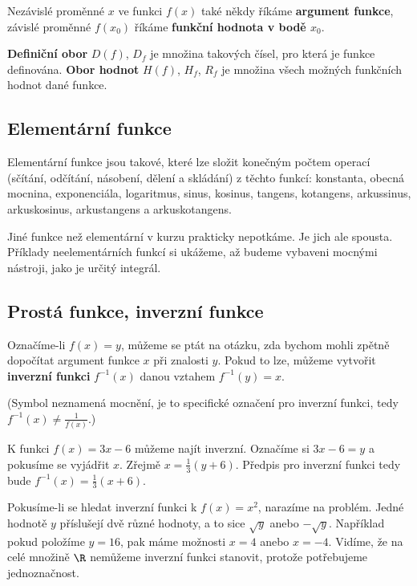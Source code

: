 Nezávislé proměnné $x$ ve funkci $f(x)$ také někdy říkáme \textbf{argument funkce}, závislé proměnné $f(x_0)$ říkáme \textbf{funkční hodnota v bodě $x_0$}.


\textbf{Definiční obor} $D(f)$, $D_f$ je množina takových čísel, pro která je funkce definována. \textbf{Obor hodnot} $H(f)$, $H_f$, $R_f$ je množina všech možných funkčních hodnot dané funkce. 

\subsection*{Elementární funkce}

Elementární funkce jsou takové, které lze složit konečným počtem operací (sčítání, odčítání, násobení, dělení a skládání) z těchto funkcí: konstanta, obecná mocnina, exponenciála, logaritmus, sinus, kosinus, tangens, kotangens, arkussinus, arkuskosinus, arkustangens a arkuskotangens. 

Jiné funkce než elementární v kurzu prakticky nepotkáme. Je jich ale spousta. Příklady neelementárních funkcí si ukážeme, až budeme vybaveni mocnými nástroji, jako je určitý integrál.

\subsection*{Prostá funkce, inverzní funkce}

Označíme-li $f(x) = y$, můžeme se ptát na otázku, zda bychom mohli zpětně dopočítat argument funkce $x$ při znalosti $y$. Pokud to lze, můžeme vytvořit \textbf{inverzní funkci} $f^{-1}(x)$ danou vztahem $f^{-1}(y) = x$. 

(Symbol  neznamená mocnění, je to specifické označení pro inverzní funkci, tedy $f^{-1}(x) \neq \frac{1}{f(x)}$.)

\begin{example}
    K funkci $f(x) = 3x-6$ můžeme najít inverzní. Označíme si $3x-6=y$ a pokusíme se vyjádřit $x$. Zřejmě $x = \frac{1}{3}(y+6)$. Předpis pro inverzní funkci tedy bude $f^{-1}(x) = \frac{1}{3} (x+6)$.
\end{example}

\begin{example}
    Pokusíme-li se hledat inverzní funkci k $f(x) = x^2$, narazíme na problém. Jedné hodnotě $y$ příslušejí dvě různé hodnoty, a to sice $\sqrt{y}$ anebo $-\sqrt{y}$. Například pokud položíme $y = 16$, pak máme možnosti $x=4$ anebo $x=-4$. Vidíme, že na celé množině $\R$ nemůžeme inverzní funkci stanovit, protože potřebujeme jednoznačnost.
\end{example}


